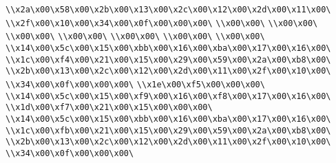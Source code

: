 \verb|\\x2a\x00\x58\x00\x2b\x00\x13\x00\x2c\x00\x12\x00\x2d\x00\x11\x00\|\newline
\verb|\\x2f\x00\x10\x00\x34\x00\x0f\x00\x00\x00\|\newline
\verb|\\x00\x00\|\newline
\verb|\\x00\x00\|\newline
\verb|\\x00\x00\|\newline
\verb|\\x00\x00\|\newline
\verb|\\x00\x00\|\newline
\verb|\\x00\x00\|\newline
\verb|\\x00\x00\|\newline
\verb|\\x14\x00\x5c\x00\x15\x00\xbb\x00\x16\x00\xba\x00\x17\x00\x16\x00\|\newline
\verb|\\x1c\x00\xf4\x00\x21\x00\x15\x00\x29\x00\x59\x00\x2a\x00\xb8\x00\|\newline
\verb|\\x2b\x00\x13\x00\x2c\x00\x12\x00\x2d\x00\x11\x00\x2f\x00\x10\x00\|\newline
\verb|\\x34\x00\x0f\x00\x00\x00\|\newline
\verb|\\x1e\x00\xf5\x00\x00\x00\|\newline
\verb|\\x14\x00\x5c\x00\x15\x00\xf9\x00\x16\x00\xf8\x00\x17\x00\x16\x00\|\newline
\verb|\\x1d\x00\xf7\x00\x21\x00\x15\x00\x00\x00\|\newline
\verb|\\x14\x00\x5c\x00\x15\x00\xbb\x00\x16\x00\xba\x00\x17\x00\x16\x00\|\newline
\verb|\\x1c\x00\xfb\x00\x21\x00\x15\x00\x29\x00\x59\x00\x2a\x00\xb8\x00\|\newline
\verb|\\x2b\x00\x13\x00\x2c\x00\x12\x00\x2d\x00\x11\x00\x2f\x00\x10\x00\|\newline
\verb|\\x34\x00\x0f\x00\x00\x00\|\newline
